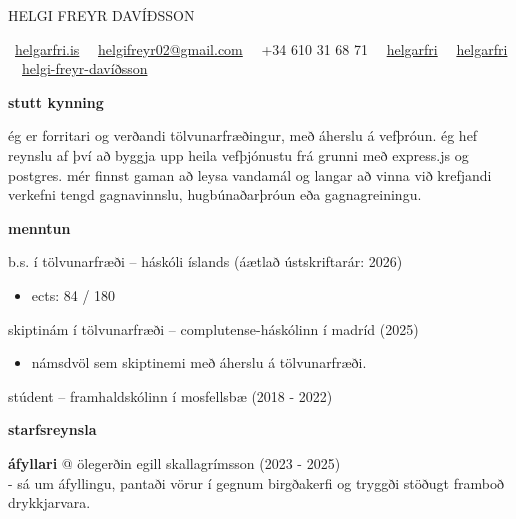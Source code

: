 \documentclass[11pt]{article}
\newcommand{\cvsection}[1]{\vspace{2em}\textbf{\large #1}\par\vspace{1em}}
\begin{document}
{\huge HELGI FREYR DAVÍÐSSON}\\
\medskip

\faGlobe\ \href{https://helgarfri.is}{helgarfri.is} \textbar\
\faEnvelope\ \href{mailto:helgifreyr02@gmail.com}{helgifreyr02@gmail.com} \textbar\
\faPhone\ +34 610 31 68 71 \textbar\
\faGithub\ \href{https://github.com/helgarfri}{helgarfri} \textbar\
\faInstagram\ \href{https://instagram.com/helgarfri}{helgarfri} \textbar\
\faLinkedin\ \href{https://www.linkedin.com/in/helgi-freyr-davíðsson-9841ba219}{helgi-freyr-davíðsson}


\cvsection{stutt kynning}
ég er forritari og verðandi tölvunarfræðingur, með áherslu á vefþróun.
ég hef reynslu af því að byggja upp heila vefþjónustu frá grunni með express.js og postgres. mér finnst gaman að leysa vandamál og langar að vinna við krefjandi verkefni tengd gagnavinnslu, hugbúnaðarþróun eða gagnagreiningu.

\cvsection{menntun}
b.s. í tölvunarfræði -- háskóli íslands \hfill (áætlað ústskriftarár: 2026)

\begin{itemize}
  \item ects: 84 / 180
\end{itemize}

skiptinám í tölvunarfræði -- complutense-háskólinn í madríd \hfill (2025)

\begin{itemize}
  \item námsdvöl sem skiptinemi með áherslu á tölvunarfræði.
\end{itemize}

stúdent -- framhaldskólinn í mosfellsbæ \hfill (2018 - 2022)

\cvsection{starfsreynsla}
\textbf{áfyllari} @ ölegerðin egill skallagrímsson \hfill (2023 - 2025)\\
- sá um áfyllingu, pantaði vörur í gegnum birgðakerfi og tryggði stöðugt framboð drykkjarvara.\\
\end{document}

